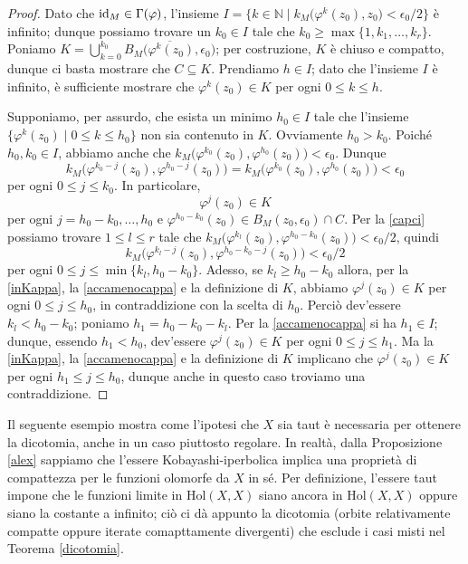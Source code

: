 \begin{proof}
    Dato che $\operatorname{id}_M\in\Gamma(\varphi)$, l'insieme $I=\{k\in\mathbb{N}\mid k_M\big(\varphi^k(z_0),z_0\big)<\epsilon_0/2\}$ è infinito; dunque possiamo trovare un $k_0 \in I$ tale che $k_0 \ge \max\{1,k_1,\dots,k_r\}$. Poniamo $\displaystyle K=\bigcup_{k=0}^{k_0}\overline{B_M\big(\varphi^k(z_0),\epsilon_0\big)}$; per costruzione, $K$ è chiuso e compatto, dunque ci basta mostrare che $C \subseteq K$. Prendiamo $h \in I$; dato che l'insieme $I$ è infinito, è sufficiente mostrare che $\varphi^k(z_0) \in K$ per ogni $0 \le k \le h$.

    Supponiamo, per assurdo, che esista un minimo $h_0 \in I$ tale che l'insieme $\{\varphi^k(z_0)\mid 0\le k\le h_0\}$ non sia contenuto in $K$. Ovviamente $h_0>k_0$. Poiché $h_0,k_0 \in I$, abbiamo anche che $k_M\big(\varphi^{k_0}(z_0),\varphi^{h_0}(z_0)\big)<\epsilon_0$. Dunque
    $$k_M\big(\varphi^{k_0-j}(z_0),\varphi^{h_0-j}(z_0)\big)=k_M\big(\varphi^{k_0}(z_0),\varphi^{h_0}(z_0)\big)<\epsilon_0$$
    per ogni $0 \le j \le k_0$. In particolare,
    \begin{equation} \label{inKappa}
        \varphi^j(z_0) \in K
    \end{equation}
    per ogni $j=h_0-k_0,\dots,h_0$ e $\varphi^{h_0-k_0}(z_0)\in B_M(z_0,\epsilon_0)\cap C$. Per la \eqref{capci} possiamo trovare $1 \le l \le r$ tale che $k_M\big(\varphi^{k_l}(z_0),\varphi^{h_0-k_0}(z_0)\big)<\epsilon_0/2$, quindi
    \begin{equation} \label{accamenocappa}
        k_M\big(\varphi^{k_l-j}(z_0),\varphi^{h_0-k_0-j}(z_0)\big)<\epsilon_0/2
    \end{equation}
    per ogni $0 \le j \le \min\{k_l,h_0-k_0\}$. Adesso, se $k_l \ge h_0-k_0$ allora, per la \eqref{inKappa}, la \eqref{accamenocappa} e la definizione di $K$, abbiamo $\varphi^j(z_0) \in K$ per ogni $0 \le j \le h_0$, in contraddizione con la scelta di $h_0$. Perciò dev'essere $k_l<h_0-k_0$; poniamo $h_1=h_0-k_0-k_l$. Per la \eqref{accamenocappa} si ha $h_1 \in I$; dunque, essendo $h_1<h_0$, dev'essere $\varphi^j(z_0) \in K$ per ogni $0 \le j \le h_1$. Ma la \eqref{inKappa}, la \eqref{accamenocappa} e la definizione di $K$ implicano che $\varphi^j(z_0) \in K$ per ogni $h_1 \le j \le h_0$, dunque anche in questo caso troviamo una contraddizione.
\end{proof}

Il seguente esempio mostra come l'ipotesi che $X$ sia taut è necessaria per ottenere la dicotomia, anche in un caso piuttosto regolare. In realtà, dalla Proposizione \ref{alex} sappiamo che l'essere Kobayashi-iperbolica implica una proprietà di compattezza per le funzioni olomorfe da $X$ in sé. Per definizione, l'essere taut impone che le funzioni limite in $\text{Hol}(X,X)$ siano ancora in $\text{Hol}(X,X)$ oppure siano la costante a infinito; ciò ci dà appunto la dicotomia (orbite relativamente compatte oppure iterate comapttamente divergenti) che esclude i casi misti nel Teorema \ref{dicotomia}.

